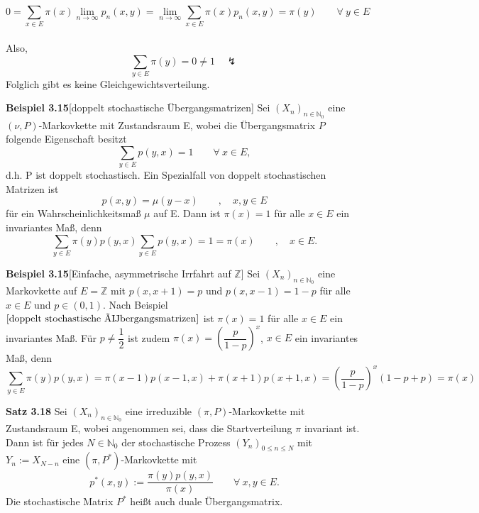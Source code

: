 \begin{itemize}
\begin{equation*}
0 = \sum_{x \in E} \pi (x) \lim_{n \to \infty}p_{n}(x,y) = \lim_{n \to \infty} \sum_{x \in E} \pi(x) p_{n}(x,y) = \pi(y) \qquad \forall \: y \in E
\end{equation*}
\mbox{}
\\
Also,
\begin{equation*}
\sum_{y \in E} \pi (y) = 0 \neq 1 \quad \lightning
\end{equation*}
Folglich gibt es keine Gleichgewichtsverteilung.
\end{itemize}

\textbf{Beispiel 3.15}[doppelt stochastische Übergangsmatrizen]
\label{doppelt stochastische Übergangsmatrizen}
Sei $(X_{n})_{n \in \mathbb{N}_{0}}$ eine $(\nu,P)$-Markovkette mit Zustandsraum E, wobei die Übergangsmatrix $P$ folgende Eigenschaft besitzt
\begin{equation*}
\sum_{y \in E} p(y,x) = 1 \qquad \forall \: x \in E,
\end{equation*}
d.h. P ist doppelt stochastisch. Ein Spezialfall von doppelt stochastischen Matrizen ist
\begin{equation*}
 p(x,y) = \mu(y-x) \qquad, \quad x,y \in E
\end{equation*} 
für ein Wahrscheinlichkeitsmaß $\mu$ auf E. Dann ist $\pi(x) = 1$ für alle $x \in E$ ein invariantes Maß, denn 
\begin{equation*}
\sum_{y \in E} \pi(y) p(y,x) \sum_{y \in E} p(y,x) = 1 = \pi(x) \qquad , \quad x \in E.
\end{equation*}

\textbf{Beispiel 3.15}[Einfache, asymmetrische Irrfahrt auf $\mathbb{Z}$]
\label{Einfache, asymmetrische Irrfahrt auf Z}
Sei $(X_{n})_{n \in \mathbb{N}_{0}}$ eine Markovkette auf $E=\mathbb{Z}$ mit $p(x,x+1) = p$ und $p(x,x-1)=1-p$ für alle $x \in E$ und $p \in (0,1)$. Nach Beispiel $\ref{doppelt stochastische Übergangsmatrizen}$ ist $\pi(x) = 1$ für alle $x \in E$ ein invariantes Maß. Für  $p \neq \dfrac{1}{2}$ ist zudem $\pi(x) = {\left( \dfrac{p}{1-p} \right)}^{x}$, $x \in E$ ein invariantes Maß, denn
\begin{equation*}
\sum_{y \in E} \pi(y) p(y,x) = \pi(x-1)p(x-1,x) + \pi(x+1)p(x+1,x)= {\left( \dfrac{p}{1-p} \right)}^{x}(1-p+p) = \pi(x)
\end{equation*}

\textbf{Satz 3.18}
Sei $(X_{n})_{n \in \mathbb{N}_{0}}$ eine irreduzible $(\pi,P)$-Markovkette mit Zustandsraum E, wobei angenommen sei, dass die Startverteilung $\pi$ invariant ist. Dann ist für jedes $N \in \mathbb{N}_{0}$ der stochastische Prozess $(Y_{n})_{0 \leq n \leq N}$ mit $Y_{n} := X_{N-n}$ eine $(\pi,P^{*})$-Markovkette mit
\begin{equation*}
p^{*}(x,y) := \dfrac{\pi (y) p(y,x)}{\pi(x)} \qquad \forall \: x,y \in E.
\end{equation*}
Die stochastische Matrix $P^{*}$ heißt auch duale Übergangsmatrix.

